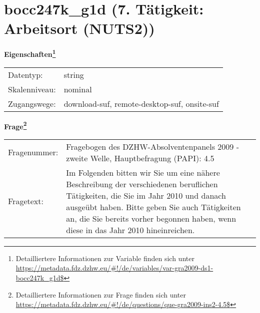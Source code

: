 
    \setcounter{footnote}{0}

    \vspace*{-1.8cm}
	\section{bocc247k\_g1d (7. Tätigkeit: Arbeitsort (NUTS2))}
	\label{section:bocc247k_g1d}



    \vspace*{0.5cm}
    \noindent\textbf{Eigenschaften\footnote{Detailliertere Informationen zur Variable finden sich unter
		\url{https://metadata.fdz.dzhw.eu/\#!/de/variables/var-gra2009-ds1-bocc247k_g1d$}}}\\
	\begin{tabularx}{\hsize}{@{}lX}
	Datentyp: & string \\
	Skalenniveau: & nominal \\
	Zugangswege: &
	  download-suf, 
	  remote-desktop-suf, 
	  onsite-suf
 \\
    \end{tabularx}



				\vspace*{0.5cm}
                \noindent\textbf{Frage\footnote{Detailliertere Informationen zur Frage finden sich unter
		              \url{https://metadata.fdz.dzhw.eu/\#!/de/questions/que-gra2009-ins2-4.5$}}}\\
				\begin{tabularx}{\hsize}{@{}lX}
					Fragenummer: &
					  Fragebogen des DZHW-Absolventenpanels 2009 - zweite Welle, Hauptbefragung (PAPI):
					  4.5
 \\
					Fragetext: & Im Folgenden bitten wir Sie um eine nähere Beschreibung der verschiedenen beruflichen Tätigkeiten, die Sie im Jahr 2010 und danach ausgeübt haben. Bitte geben Sie auch Tätigkeiten an, die Sie bereits vorher begonnen haben, wenn diese in das Jahr 2010 hineinreichen. \\
				\end{tabularx}





